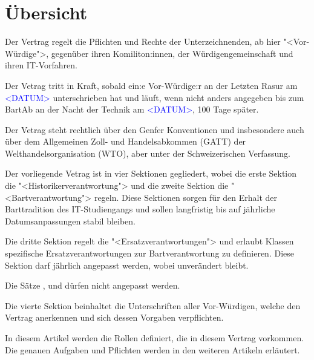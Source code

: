 \documentclass[fontsize=12pt,parskip=half]{scrartcl}
\begin{document}
\section{Übersicht}
\begin{contract}

  \Clause[title={Zweck}]
  Der Vertrag regelt die Pflichten und Rechte der Unterzeichnenden, ab hier "<Vor-Würdige">, gegenüber ihren Komiliton:innen, der Würdigengemeinschaft und ihren IT-Vorfahren.

  \Clause[title={Gültigkeit}]\label{gueltigkeit}
  Der Vetrag tritt in Kraft, sobald ein:e Vor-Würdige:r an der Letzten Rasur am \textcolor{blue}{<DATUM>} unterschrieben hat und läuft, wenn nicht anders angegeben bis zum BartAb
  an der Nacht der Technik am \textcolor{blue}{<DATUM>}, 100 Tage später.

  Der Vetrag steht rechtlich über den Genfer Konventionen und insbesondere auch über dem Allgemeinen Zoll- und Handelsabkommen (GATT) der Welthandelsorganisation (WTO),
  aber unter der Schweizerischen Verfassung.

  \Clause[title={Struktur}]
  Der vorliegende Vetrag ist in vier Sektionen gegliedert, wobei die erste Sektion die "<Historikerverantwortung"> und die zweite Sektion die "<Bartverantwortung"> regeln. Diese Sektionen
  sorgen für den Erhalt der Barttradition des IT-Studiengangs und sollen langfristig bis auf jährliche Datumsanpassungen stabil bleiben. \label{struktur.base}

  Die dritte Sektion regelt die "<Ersatzverantwortungen"> und erlaubt Klassen spezifische Ersatzverantwortungen zur Bartverantwortung zu definieren. Diese Sektion darf jährlich angepasst werden,
  wobei  unverändert bleibt.\label{struktur.ersatz}

  Die Sätze ,  und  dürfen nicht angepasst werden.\label{struktur.schutz}

  Die vierte Sektion beinhaltet die Unterschriften aller Vor-Würdigen, welche den Vertrag anerkennen und sich dessen Vorgaben verpflichten.

  \Clause[title={Rollen}]
  In diesem Artikel werden die Rollen definiert, die in diesem Vertrag vorkommen. Die genauen Aufgaben und Pflichten werden in den weiteren Artikeln erläutert.


\end{contract}
\end{document}
